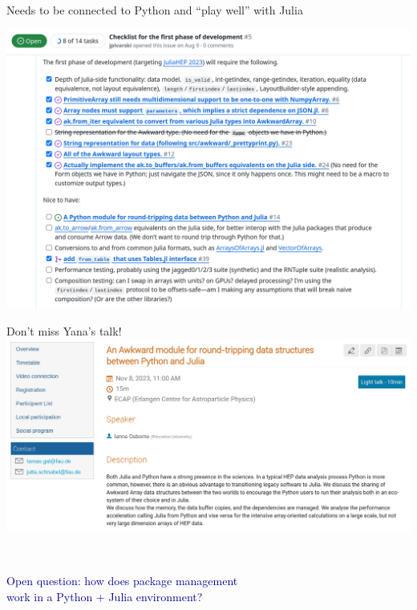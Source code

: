 \documentclass[aspectratio=169]{beamer}
\begin{document}
\begin{frame}{Needs to be connected to Python and ``play well'' with Julia}
\vspace{0.1 cm}
\begin{center}
\includegraphics[width=0.82\linewidth]{issue-5.png}
\end{center}
\end{frame}

\begin{frame}{Don't miss Yana's talk!}
\vspace{0.5 cm}
\includegraphics[width=\linewidth]{ianna-lightning-talk.png}
\end{frame}

\begin{frame}{\mbox{ }}
\vspace{0.5 cm}
\LARGE
\begin{center}
\textcolor{darkblue}{Open question: how does package management \\ work in a Python + Julia environment?}
\end{center}

\vspace{1 cm}
\begin{center}
\end{center}
\end{frame}
\end{document}
